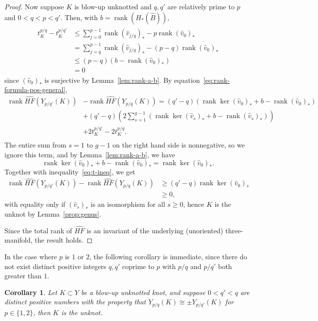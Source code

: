 \documentclass{article}
\newtheorem{corollary}[equation]{Corollary}
\theoremstyle{remark}
\numberwithin{equation}{section}
\numberwithin{table}{section}
\newcommand{\wh}{\widehat}
\DeclareMathOperator{\rank}{rank}
\renewcommand{\(}{\left(}
\renewcommand{\)}{\right)}
\begin{document}
\begin{proof}
Now suppose $K$ is blow-up unknotted and $q,q'$ are relatively prime to $p$ and $0<q<p<q'$. Then, with $b=\rank(H_*(\wh B))$,
\begin{align}\label{eq:t-ineq}
\begin{split}
    t_K^{p/q}-t_K^{p/q'} &\le \sum_{j=0}^{p-1} \rank(\wh v_{j/q})_* - p\rank(\wh v_0)_* \\
    &= \sum_{j=q}^{p-1} \rank(\wh v_{j/q})_* - (p-q)\rank(\wh v_0)_* \\
    &\le (p-q)(b-\rank(\wh v_0)_*) \\
    &= 0
\end{split}
\end{align} since $(\wh v_0)_*$ is surjective by Lemma~\ref{lem:rank-a-b}. By equation~\ref{eq:rank-formula-pos-general},
\begin{align*}
    \rank\wh{HF}(Y_{p/q'}(K))&-\rank\wh{HF}(Y_{p/q}(K)) = (q'-q)(\rank\ker(\wh v_0)_*+b-\rank(\wh v_0)_*) \\
    &+ (q'-q)\left(2\sum_{s=1}^{g-1}(\rank\ker(\wh v_s)_*+b-\rank(\wh v_s)_*)\right) \\
    &+ 2t_K^{p/q'}-2t_K^{p/q}. \\
\end{align*}
The entire sum from $s=1$ to $g-1$ on the right hand side is nonnegative, so we ignore this term, and by Lemma~\ref{lem:rank-a-b}, we have 
$$\rank\ker(\wh v_0)_*+b-\rank(\wh v_0)_*= \rank\ker(\wh v_0)_*.$$ Together with inequality~\ref{eq:t-ineq}, we get
\begin{align*}
    \rank\wh{HF}(Y_{p/q'}(K))-\rank\wh{HF}(Y_{p/q}(K)) &\ge (q'-q)\rank\ker(\wh v_0)_*\\
    &\ge 0,
\end{align*} with equality only if $(\wh v_s)_*$ is an isomorphism for all $s\ge 0$, hence $K$ is the unknot by Lemma~\ref{prop:genus}.

Since the total rank of $\wh{HF}$ is an invariant of the underlying (unoriented) three-manifold, the result holds.
\end{proof}

In the case where $p$ is $1$ or $2$, the following corollary is immediate, since there do not exist distinct positive integers $q,q'$ coprime to $p$ with $p/q$ and $p/q'$ both greater than $1$.

\begin{corollary}
Let $K\subset Y$ be a blow-up unknotted knot, and suppose $0<q'<q$ are distinct positive numbers with the property that $Y_{p/q}(K)\cong\pm Y_{p/q'}(K)$ for $p\in\{1,2\}$, then $K$ is the unknot.
\end{corollary}
\end{document}

